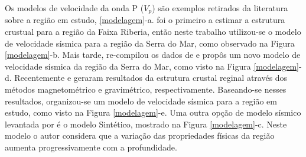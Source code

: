 Os modelos de velocidade da onda P ($V_{p}$) são exemplos retirados da literatura sobre a região em estudo, \ref{modelagem}-a. \cite{Bassini_1986} foi o primeiro a estimar a estrutura crustual para a região da Faixa Riberia, então neste trabalho utilizou-se o modelo de velocidade sísmica para a região da Serra do Mar, como observado na Figura \ref{modelagem}-b. Mais tarde, \cite{sand_franca_crustal_2004} re-compilou os dados de \cite{Bassini_1986} e propôs um novo modelo de velocidade sísmica da região da Serra do Mar, como visto na Figura \ref{modelagem}-d. Recentemente \cite{flora_solon_ancient_2013} e \cite{Silva_2014} geraram resultados da estrutura crustal reginal através dos métodos magnetométrico e gravimétrico, respectivamente. Baseando-se nesses resultados, organizou-se um modelo de velocidade sísmica para a região em estudo, como visto na Figura \ref{modelagem}-e. Uma outra opção de modelo sísmico levantada por \cite{sand_franca_crustal_2004} é o modelo Sintético, mostrado na Figura \ref{modelagem}-c. Neste modelo o autor considera que a variação das propriedades físicas da região aumenta progressivamente com a profundidade.

